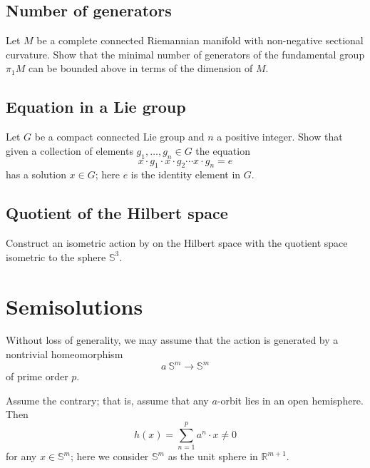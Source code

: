 \subsection*{Number of generators}\label{Number of generators}

\begin{pr}
Let $M$ be a complete connected Riemannian manifold with non-negative sectional curvature.
Show that the minimal number of generators of the fundamental group $\pi_1 M$
can be bounded above in terms of the dimension of $M$.
\end{pr}


\subsection*{Equation in a Lie group\easy}\label{Equations in the group}

\begin{pr}
Let $G$ be a compact connected Lie group and $n$ a positive integer.
Show that given a collection of elements $g_1,\dots,g_n\in G$
the equation 
\[x\cdot g_1\cdot x\cdot g_2\cdots x\cdot g_n=e\]
has a solution $x\in G$;
here $e$ is the identity element in $G$.
\end{pr}

\subsection*{Quotient of the Hilbert space\hard}\label{Quotient of Hilbert space}

\begin{pr}
Construct an isometric action by on the Hilbert space with the quotient space isometric to the sphere $\mathbb{S}^3$.
\end{pr}

\section*{Semisolutions}
Without loss of generality, we may assume that the action is generated by a nontrivial homeomorphism 
\[a\:\mathbb{S}^m\to\mathbb{S}^m\] 
of prime order $p$.

Assume the contrary; that is, assume that any $a$-orbit lies in an open hemisphere.
Then 
\[h(x)=\sum_{n=1}^p a^n\cdot x\ne0\]
for any $x\in\mathbb{S}^m$; here we consider $\mathbb{S}^m$ as the unit sphere in $\mathbb{R}^{m+1}$.

